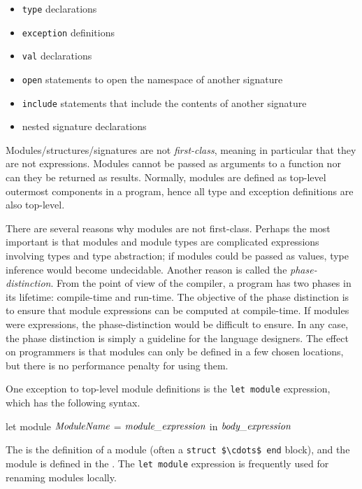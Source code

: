 \begin{itemize}
\item \lstinline$type$ declarations
\item \lstinline$exception$ definitions
\item \lstinline$val$ declarations
\item \lstinline$open$ statements to open the namespace of another signature
\item \lstinline$include$ statements that include the contents of another signature
\item nested signature declarations
\end{itemize}
%


Modules/structures/signatures are not \emph{first-class}, meaning in
particular that they are not expressions.  Modules cannot be passed as
arguments to a function nor can they be returned as results.
Normally, modules are defined as top-level outermost components in a
program, hence all type and exception definitions are also top-level.

 There are several reasons why modules are not first-class.  Perhaps the
most important is that modules and module types are complicated expressions involving types and type
abstraction; if modules could be passed as values, type inference would become undecidable.  Another
reason is called the \emph{phase-distinction}.  From the point of view of the compiler, a program
has two phases in its lifetime: compile-time and run-time.  The objective of the phase distinction
is to ensure that module expressions can be computed at compile-time.  If modules were expressions,
the phase-distinction would be difficult to ensure.  In any case, the phase distinction is simply a
guideline for the language designers.  The effect on programmers is that modules can only be defined
in a few chosen locations, but there is no performance penalty for using them.


One exception to top-level module definitions is the
%
\hbox{\lstinline$let module$}
%
expression, which has the following syntax.

\begin{ocaml}
let module $\textit{\rmfamily ModuleName}$ = $\textit{\rmfamily module\_expression}$ in $\textit{\rmfamily body\_expression}$
\end{ocaml}
%
The  is the definition of a module
(often a \hbox{\lstinline/struct $\cdots$ end/} block), and the module is
defined in the .  The
%
\hbox{\lstinline$let module$}
%
expression is frequently used for renaming modules locally.

